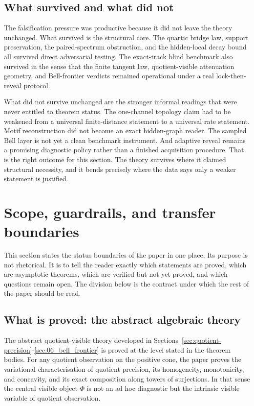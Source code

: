 \documentclass[11pt]{article}
\numberwithin{equation}{section}
\theoremstyle{thmcompact}
\theoremstyle{remark}
\begin{document}
\subsection{What survived and what did not}

The falsification pressure was productive because it did not leave the theory unchanged. What survived is the structural core. The quartic bridge law, support preservation, the paired-spectrum obstruction, and the hidden-local decay bound all survived direct adversarial testing. The exact-track blind benchmark also survived in the sense that the finite tangent law, quotient-visible attenuation geometry, and Bell-frontier verdicts remained operational under a real lock-then-reveal protocol.

What did not survive unchanged are the stronger informal readings that were never entitled to theorem status. The one-channel topology claim had to be weakened from a universal finite-distance statement to a universal rate statement. Motif reconstruction did not become an exact hidden-graph reader. The sampled Bell layer is not yet a clean benchmark instrument. And adaptive reveal remains a promising diagnostic policy rather than a finished acquisition procedure. That is the right outcome for this section. The theory survives where it claimed structural necessity, and it bends precisely where the data says only a weaker statement is justified.

\section{Scope, guardrails, and transfer boundaries}
\label{sec:12_scope}

This section states the status boundaries of the paper in one place. Its purpose is not rhetorical. It is to tell the reader exactly which statements are proved, which are asymptotic theorems, which are verified but not yet proved, and which questions remain open. The division below is the contract under which the rest of the paper should be read.

\subsection{What is proved: the abstract algebraic theory}

The abstract quotient-visible theory developed in Sections~\ref{sec:quotient-precision}-\ref{sec:06_bell_frontier} is proved at the level stated in the theorem bodies. For any quotient observation on the positive cone, the paper proves the variational characterisation of quotient precision, its homogeneity, monotonicity, and concavity, and its exact composition along towers of surjections. In that sense the central visible object $\Phi$ is not an ad hoc diagnostic but the intrinsic visible variable of quotient observation.
\end{document}
